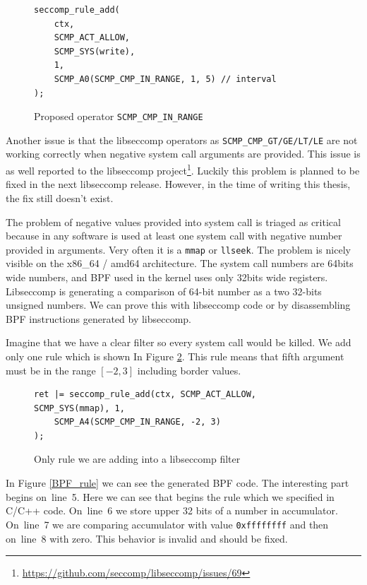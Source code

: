 \begin{figure}[h]
	\label{libseccomp_in_range}
	\lstset{style=c++}
	\begin{lstlisting}
seccomp_rule_add(
	ctx,
	SCMP_ACT_ALLOW,
	SCMP_SYS(write),
	1,
	SCMP_A0(SCMP_CMP_IN_RANGE, 1, 5) // interval
);
	\end{lstlisting}
	\caption{Proposed operator \texttt{SCMP\_CMP\_IN\_RANGE}}
\end{figure}

Another issue is that the libseccomp operators as
\texttt{SCMP\_CMP\_GT/GE/LT/LE} are not work\-ing correctly when negative system
call arguments are provided. This issue is as well reported to the libseccomp
project\footnote{\url{https://github.com/seccomp/libseccomp/issues/69}}. Luckily
this problem is planned to be fixed in the next libseccomp release. However, in
the time of writing this thesis, the fix still doesn’t exist.

The problem of negative values provided into system call is triaged as critical
because in any software is used at least one system call with negative number
provided in arguments. Very often it is a \texttt{mmap} or \texttt{llseek}. The
problem is nicely visible on the x86\_64 / amd64 architecture. The system call
numbers are 64bits wide numbers, and BPF used in the kernel uses only 32bits
wide registers. Libseccomp is generating a comparison of 64-bit number as a two
32-bits unsigned numbers. We can prove this with libseccomp code or by
disassembling BPF instructions generated by libseccomp.

Imagine that we have a clear filter so every system call would be killed. We add
only one rule which is shown In Figure \ref{libseccomp_rule}. This rule means
that fifth argument must be in the range $[-2, 3]$ including border values.

\begin{figure}[h]
	\label{libseccomp_rule}
	\lstset{style=c++}
	\begin{lstlisting}
ret |= seccomp_rule_add(ctx, SCMP_ACT_ALLOW, SCMP_SYS(mmap), 1,
	SCMP_A4(SCMP_CMP_IN_RANGE, -2, 3)
);
	\end{lstlisting}
	\caption{Only rule we are adding into a libseccomp filter}
\end{figure}

In Figure \ref{BPF_rule} we can see the generated BPF code. The interesting part
begins on~line~5. Here we can see that begins the rule which we specified in
C/C++ code. On~line~6 we store upper 32 bits of a number in accumulator.
On~line~7 we are comparing accumulator with value \texttt{0xffffffff} and then
on~line~8 with zero. This behavior is invalid and should be fixed.

